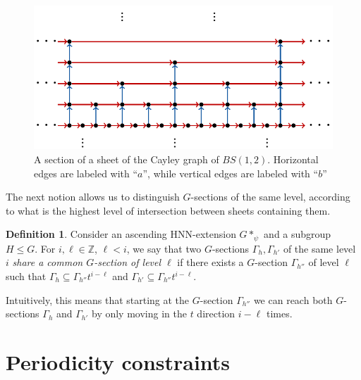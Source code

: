 \documentclass[letterpaper,11pt,reqno]{amsart}
\theoremstyle{plain}
\theoremstyle{definition}
\newtheorem{definition}{Definition}[section]
\begin{document}
\begin{figure}[h]
	\centering
	\includegraphics[scale=0.9]{bs_onesheet.pdf}
	\caption{A section of a sheet of the Cayley graph of $BS(1,2)$.  Horizontal edges are labeled with ``$a$'', while vertical edges are labeled with ``$b$''}
	\label{fig:bssheet}
\end{figure}

The next notion allows us to distinguish $G$-sections of the same level, according to what is the highest level of intersection between sheets containing them.

\begin{definition} Consider an ascending HNN-extension $G*_{\psi}$ and a subgroup $H\leqslant G$. For $i,\ell\in \mathbb{Z}$, $\ell < i$, we say that two $G$-sections $\Gamma_h, \Gamma_{h'}$ of the same level $i$ \textit{share a common $G$-section of level $\ell$} if there exists a $G$-section $\Gamma_{h''}$ of level $\ell$ such that $\Gamma_{h}\subseteq \Gamma_{h''}t^{i-\ell}$ and $\Gamma_{h'}\subseteq \Gamma_{h''}t^{i-\ell}$.
	
	Intuitively, this means that starting at the $G$-section $\Gamma_{h''}$ we can reach both $G$-sections $\Gamma_{h}$ and $\Gamma_{h'}$ by only moving in the $t$ direction $i-\ell$ times.
\end{definition}



\section{Periodicity constraints}\label{section:weak_periodicity}
\end{document}
